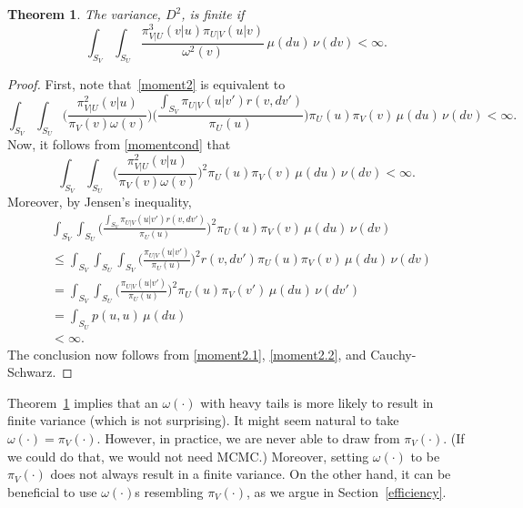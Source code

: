 \documentclass[11pt]{article}
\newtheorem{theorem}{Theorem}
\begin{document}
	\begin{theorem} \label{secondmoment}
		The variance, $D^2$, is finite if
		\begin{equation} \label{momentcond}
		\int_{S_V} \int_{S_U} \frac{\pi_{V|U}^3(v|u) \pi_{U|V}(u|v)} {\omega^2(v)} \, \mu(du) \,\nu(dv) < \infty.
		\end{equation}
	\end{theorem}
	\begin{proof}
          First, note that~\eqref{moment2} is equivalent to
		\begin{equation*}
		\int_{S_V} \int_{S_U} \bigg(\frac{\pi^2_{V|U}(v|u)}{\pi_V(v)\omega(v)}\bigg) \bigg( \frac{\int_{S_V} \pi_{U|V}(u|v') r(v,dv')}{\pi_U(u)} \bigg) \pi_U(u)\pi_V(v) \, \mu(du)\,\nu(dv) < \infty.
		\end{equation*}
		Now, it follows from \eqref{momentcond} that
		\begin{equation} \label{moment2.1}
		\int_{S_V} \int_{S_U} \bigg(\frac{\pi^2_{V|U}(v|u)}{\pi_V(v)\omega(v)}\bigg)^2 \pi_U(u)\pi_V(v) \, \mu(du)\,\nu(dv) < \infty.
		\end{equation}
		Moreover, by Jensen's inequality,
		\begin{equation} \label{moment2.2}
		\begin{aligned}
		&\int_{S_V} \int_{S_U} \bigg( \frac{\int_{S_V} \pi_{U|V}(u|v') r(v,dv')}{\pi_U(u)} \bigg)^2 \pi_U(u)\pi_V(v) \, \mu(du)\,\nu(dv) \\
		& \leq \int_{S_V} \int_{S_U} \int_{S_V} \bigg( \frac{\pi_{U|V}(u|v')}{\pi_U(u)} \bigg)^2 r(v,dv') \pi_U(u)\pi_V(v) \, \mu(du)\,\nu(dv) \\
		&= \int_{S_V} \int_{S_U} \bigg( \frac{\pi_{U|V}(u|v')}{\pi_U(u)} \bigg)^2 \pi_U(u)\pi_V(v') \, \mu(du)\,\nu(dv') \\
		&= \int_{S_U} p(u,u) \, \mu(du) \\
		& < \infty.
		\end{aligned}
		\end{equation}
		The conclusion now follows from \eqref{moment2.1},
                \eqref{moment2.2}, and Cauchy-Schwarz.
	\end{proof}
	
	Theorem~\ref{secondmoment} implies that an $\omega(\cdot)$
        with heavy tails is more likely to result in finite variance
        (which is not surprising). It might seem natural to take
        $\omega(\cdot) = \pi_V(\cdot)$.  However, in practice, we are
        never able to draw from $\pi_V(\cdot)$.  (If we could do that,
        we would not need MCMC.)  
        Moreover, setting $\omega(\cdot)$ to be $\pi_V(\cdot)$ does not always result in a finite variance.
        On the other hand, it can be beneficial to use $\omega(\cdot)$s resembling $\pi_V(\cdot)$, as we argue in Section~\ref{efficiency}.
        
\end{document}
